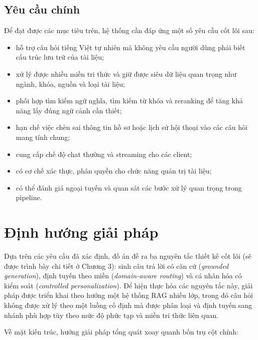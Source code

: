 \documentclass[../DoAn.tex]{subfiles}
\begin{document}
\subsection{Yêu cầu chính}

Để đạt được các mục tiêu trên, hệ thống cần đáp ứng một số yêu cầu cốt lõi sau:

\begin{itemize}
    \item hỗ trợ câu hỏi tiếng Việt tự nhiên mà không yêu cầu người dùng phải
    biết cấu trúc lưu trữ của tài liệu;
    \item xử lý được nhiều miền tri thức và giữ được siêu dữ liệu quan trọng
    như ngành, khóa, nguồn và loại tài liệu;
    \item phối hợp tìm kiếm ngữ nghĩa, tìm kiếm từ khóa và reranking để tăng
    khả năng lấy đúng ngữ cảnh cần thiết;
    \item hạn chế việc chèn sai thông tin hồ sơ hoặc lịch sử hội thoại vào
    các câu hỏi mang tính chung;
    \item cung cấp chế độ chat thường và streaming cho các client;
    \item có cơ chế xác thực, phân quyền cho chức năng quản trị tài liệu;
    \item có thể đánh giá ngoại tuyến và quan sát các bước xử lý quan trọng
    trong pipeline.
\end{itemize}

\section{Định hướng giải pháp}
\label{sec:dinhhuong}

Dựa trên các yêu cầu đã xác định, đồ án đề ra ba nguyên tắc thiết kế cốt lõi (sẽ được trình bày chi tiết ở Chương 3): sinh câu trả lời có căn cứ (\textit{grounded generation}), định tuyến theo miền (\textit{domain-aware routing}) và cá nhân hóa có kiểm soát (\textit{controlled personalization}). Để hiện thực hóa các nguyên tắc này, giải pháp được triển khai theo hướng một hệ thống RAG nhiều lớp, trong đó câu hỏi không được xử lý theo một luồng cố định mà được phân loại và định tuyến sang nhánh phù hợp tùy theo mức độ phức tạp và miền tri thức liên quan.

Về mặt kiến trúc, hướng giải pháp tổng quát xoay quanh bốn trụ cột chính:
\end{document}
